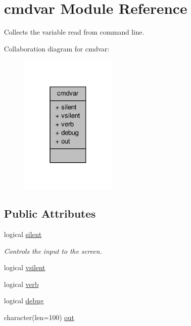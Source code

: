 \hypertarget{classcmdvar}{\section{cmdvar Module Reference}
\label{classcmdvar}
}


Collects the variable read from command line.  




Collaboration diagram for cmdvar\-:\nopagebreak
\begin{figure}[H]
\begin{center}
\leavevmode
\includegraphics[width=134pt]{classcmdvar__coll__graph}
\end{center}
\end{figure}
\subsection*{Public Attributes}
\begin{DoxyCompactItemize}
\item 
logical \hyperlink{classcmdvar_a774f2caff8f9563a52b69cf5c205da28}{silent}
\begin{DoxyCompactList}\small\item\em Controls the input to the screen. \end{DoxyCompactList}\item 
logical \hyperlink{classcmdvar_a5d5ef4d5f7d8f3ec8c8e390e0f594ec1}{vsilent}
\item 
logical \hyperlink{classcmdvar_ab46a1faddb3f0a3fe76bfa461154ffcc}{verb}
\item 
logical \hyperlink{classcmdvar_a040fa7b1b07323379cfc623dbf43d7c0}{debug}
\item 
character(len=100) \hyperlink{classcmdvar_aa24632df9762e42214c48cd1f53bb6e3}{out}
\end{DoxyCompactItemize}


